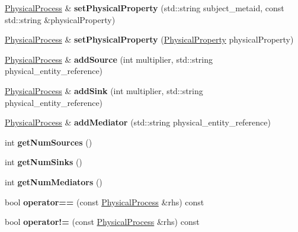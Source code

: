 \begin{DoxyCompactItemize}
\item 
\mbox{\label{classomexmeta_1_1PhysicalProcess_ac875058d67408246aa28cf58dd77ccf6}} 
\hyperlink{classomexmeta_1_1PhysicalProcess}{Physical\+Process} \& {\bfseries set\+Physical\+Property} (std\+::string subject\+\_\+metaid, const std\+::string \&physical\+Property)
\item 
\mbox{\label{classomexmeta_1_1PhysicalProcess_ac49bf4a1c21c6590a9d2af7ae93e13a7}} 
\hyperlink{classomexmeta_1_1PhysicalProcess}{Physical\+Process} \& {\bfseries set\+Physical\+Property} (\hyperlink{classomexmeta_1_1PhysicalProperty}{Physical\+Property} physical\+Property)
\item 
\mbox{\label{classomexmeta_1_1PhysicalProcess_ab83f58b7df77fdee131c22c71da22f39}} 
\hyperlink{classomexmeta_1_1PhysicalProcess}{Physical\+Process} \& {\bfseries add\+Source} (int multiplier, std\+::string physical\+\_\+entity\+\_\+reference)
\item 
\mbox{\label{classomexmeta_1_1PhysicalProcess_a403ffc7d7d29702f2ff4e56084a1d714}} 
\hyperlink{classomexmeta_1_1PhysicalProcess}{Physical\+Process} \& {\bfseries add\+Sink} (int multiplier, std\+::string physical\+\_\+entity\+\_\+reference)
\item 
\mbox{\label{classomexmeta_1_1PhysicalProcess_a2bdf8dde5ffa6b38d5042db49fd211d1}} 
\hyperlink{classomexmeta_1_1PhysicalProcess}{Physical\+Process} \& {\bfseries add\+Mediator} (std\+::string physical\+\_\+entity\+\_\+reference)
\item 
\mbox{\label{classomexmeta_1_1PhysicalProcess_a56459d9f0087a3f92b0aca5d148b65f5}} 
int {\bfseries get\+Num\+Sources} ()
\item 
\mbox{\label{classomexmeta_1_1PhysicalProcess_ac8b79af15d4d19042ee34abca25f679f}} 
int {\bfseries get\+Num\+Sinks} ()
\item 
\mbox{\label{classomexmeta_1_1PhysicalProcess_a717a352ce3bb956201174002f904cd26}} 
int {\bfseries get\+Num\+Mediators} ()
\item 
\mbox{\label{classomexmeta_1_1PhysicalProcess_a65585bf5cd473d509f6f66c96757ff8d}} 
bool {\bfseries operator==} (const \hyperlink{classomexmeta_1_1PhysicalProcess}{Physical\+Process} \&rhs) const
\item 
\mbox{\label{classomexmeta_1_1PhysicalProcess_af8298394b713807ec51c2b5f60afd00e}} 
bool {\bfseries operator!=} (const \hyperlink{classomexmeta_1_1PhysicalProcess}{Physical\+Process} \&rhs) const
\end{DoxyCompactItemize}
